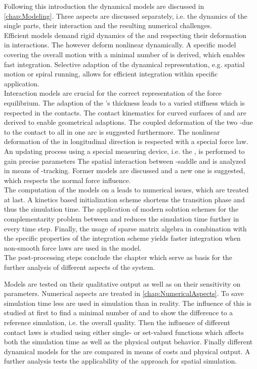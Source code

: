 Following this introduction the dynamical models are discussed in \cref{chap:Modeling}.
Three aspects are discussed separately, i.e. the dynamics of the single parts, their interaction and the resulting numerical challenges.\\
Efficient models demand rigid dynamics of the \els and \sheaves respecting their deformation in interactions.
The \rings however deform nonlinear dynamically.
A specific model covering the overall motion with a minimal number of \DOFs is derived, which enables fast integration.
Selective adaption of the dynamical representation, e.g. spatial motion or spiral running, allows for efficient integration within specific application.\\
Interaction models are crucial for the correct representation of the force equilibrium.
The adaption of the \el's thickness leads to a varied stiffness which is respected in the contacts.
The contact kinematics for curved surfaces of \sheaves and \els are derived to enable geometrical adaptions.
The coupled deformation of the two \pulley-\sheaves due to the contact to all \els in one arc is suggested furthermore.
The nonlinear deformation of the \els in longitudinal direction is respected with a special force law.
An updating process using a special measuring device, i.e. the \PFT, is performed to gain precise parameters 
The spatial interaction between \el-saddle and \ring is analyzed in means of \ring-tracking. 
Former models are discussed and a new one is suggested, which respects the normal force influence.\\
The computation of the models on a \CPU leads to numerical issues, which are treated at last.
A kinetics based initialization scheme shortens the transition phase and thus the simulation time.
The application of modern solution schemes for the complementarity problem between \els and \sheaves reduces the simulation time further in every time step.
Finally, the usage of sparse matrix algebra in combination with the specific properties of the integration scheme yields faster integration when non-smooth force laws are used in the model.\\
The post-processing steps conclude the chapter which serve as basis for the further analysis of different aspects of the system.\par

Models are tested on their qualitative output as well as on their sensitivity on parameters.
Numerical aspects are treated in \cref{chap:NumericalAspects}.
To save simulation time less \els are used in simulation than in reality.
The influence of this is studied at first to find a minimal number of \els and to show the difference to a reference simulation, i.e. the overall quality.
Then the influence of different contact laws is studied using either single- or set-valued functions which affects both the simulation time as well as the physical output behavior.
Finally different dynamical models for the \rings are compared in means of \CPU costs and physical output.
A further analysis tests the applicability of the approach for spatial simulation.\par

